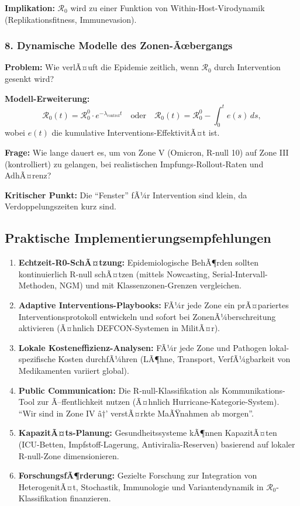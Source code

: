 ﻿\documentclass[a4paper,12pt,twoside]{article}
\theoremstyle{definition}
\begin{document}
\textbf{Implikation:} $\mathcal{R}_0$ wird zu einer Funktion von Within-Host-Virodynamik (Replikationsfitness, Immunevasion).

\subsubsection{8. Dynamische Modelle des Zonen-Ãœbergangs}

\textbf{Problem:} Wie verlÃ¤uft die Epidemie zeitlich, wenn $\mathcal{R}_0$ durch Intervention gesenkt wird?

\textbf{Modell-Erweiterung:}
\[
\mathcal{R}_0(t) = \mathcal{R}_0^0 \cdot e^{-\lambda_{\text{control}} t} \quad \text{oder} \quad \mathcal{R}_0(t) = \mathcal{R}_0^0 - \int_0^t e(s) \, ds,
\]
wobei $e(t)$ die kumulative Interventions-EffektivitÃ¤t ist.

\textbf{Frage:} Wie lange dauert es, um von Zone V (Omicron, R-null 10) auf Zone III (kontrolliert) zu gelangen, bei realistischen Impfungs-Rollout-Raten und AdhÃ¤renz?

\textbf{Kritischer Punkt:} Die ``Fenster'' fÃ¼r Intervention sind klein, da Verdoppelungszeiten kurz sind.

\subsection{Praktische Implementierungsempfehlungen}

\begin{enumerate}

\item \textbf{Echtzeit-R0-SchÃ¤tzung:} Epidemiologische BehÃ¶rden sollten kontinuierlich R-null schÃ¤tzen (mittels Nowcasting, Serial-Intervall-Methoden, NGM) und mit Klassenzonen-Grenzen vergleichen.

\item \textbf{Adaptive Interventions-Playbooks:} FÃ¼r jede Zone ein prÃ¤pariertes Interventionsprotokoll entwickeln und sofort bei ZonenÃ¼berschreitung aktivieren (Ã¤hnlich DEFCON-Systemen in MilitÃ¤r).

\item \textbf{Lokale Kosteneffizienz-Analysen:} FÃ¼r jede Zone und Pathogen lokal-spezifische Kosten durchfÃ¼hren (LÃ¶hne, Transport, VerfÃ¼gbarkeit von Medikamenten variiert global).

\item \textbf{Public Communication:} Die R-null-Klassifikation als Kommunikations-Tool zur Ã–ffentlichkeit nutzen (Ã¤hnlich Hurricane-Kategorie-System). ``Wir sind in Zone IV â†’ verstÃ¤rkte MaÃŸnahmen ab morgen''.

\item \textbf{KapazitÃ¤ts-Planung:} Gesundheitssysteme kÃ¶nnen KapazitÃ¤ten (ICU-Betten, Impfstoff-Lagerung, Antiviralia-Reserven) basierend auf lokaler R-null-Zone dimensionieren.

\item \textbf{ForschungsfÃ¶rderung:} Gezielte Forschung zur Integration von HeterogenitÃ¤t, Stochastik, Immunologie und Variantendynamik in $\mathcal{R}_0$-Klassifikation finanzieren.

\end{enumerate}
\end{document}
